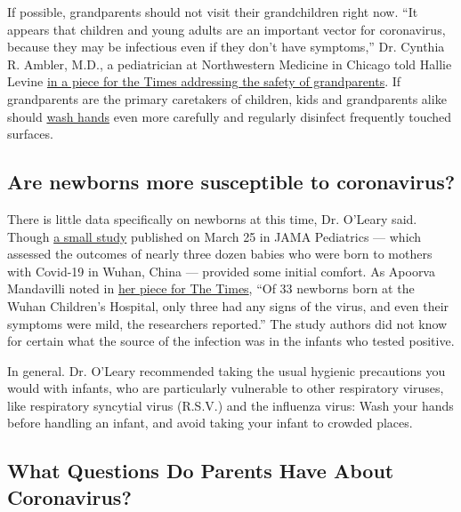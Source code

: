If possible, grandparents should not visit their grandchildren right
now. ``It appears that children and young adults are an important vector
for coronavirus, because they may be infectious even if they don't have
symptoms,'' Dr. Cynthia R. Ambler, M.D., a pediatrician at Northwestern
Medicine in Chicago told Hallie Levine
\href{https://www.nytimes3xbfgragh.onion/2020/03/20/parenting/grandparents-visit-safety-coronavirus.html}{in
a piece for the Times addressing the safety of grandparents}. If
grandparents are the primary caretakers of children, kids and
grandparents alike should
\href{https://www.nytimes3xbfgragh.onion/2020/03/13/world/how-to-wash-your-hands-coronavirus.html}{wash
hands} even more carefully and regularly disinfect frequently touched
surfaces.

\hypertarget{are-newborns-more-susceptible-to-coronavirus}{%
\subsection{Are newborns more susceptible to
coronavirus?}\label{are-newborns-more-susceptible-to-coronavirus}}

There is little data specifically on newborns at this time, Dr. O'Leary
said. Though
\href{https://jamanetwork.com/journals/jamapediatrics/fullarticle/2763787}{a
small study} published on March 25 in JAMA Pediatrics --- which assessed
the outcomes of nearly three dozen babies who were born to mothers with
Covid-19 in Wuhan, China --- provided some initial comfort. As Apoorva
Mandavilli noted in
\href{https://www.nytimes3xbfgragh.onion/2020/03/03/health/coronavirus-pregnant-women-babies.html}{her
piece for The Times}, ``Of 33 newborns born at the Wuhan Children's
Hospital, only three had any signs of the virus, and even their symptoms
were mild, the researchers reported.'' The study authors did not know
for certain what the source of the infection was in the infants who
tested positive.

In general. Dr. O'Leary recommended taking the usual hygienic
precautions you would with infants, who are particularly vulnerable to
other respiratory viruses, like respiratory syncytial virus (R.S.V.) and
the influenza virus: Wash your hands before handling an infant, and
avoid taking your infant to crowded places.

\hypertarget{what-questions-do-parents-have-about-coronavirus}{%
\subsection{What Questions Do Parents Have About
Coronavirus?}\label{what-questions-do-parents-have-about-coronavirus}}


